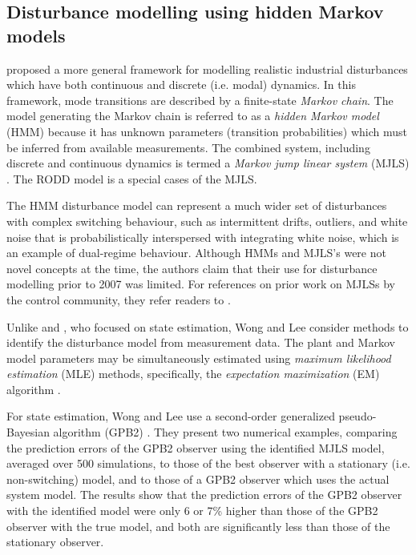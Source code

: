 \subsection{Disturbance modelling using hidden Markov models}
\label{hidden_markov_models}

\cite{wong_disturbance_2007} proposed a more general framework for modelling realistic industrial disturbances which have both continuous and discrete (i.e. modal) dynamics. In this framework, mode transitions are described by a finite-state \textit{Markov chain}. The model generating the Markov chain is referred to as a \textit{hidden Markov model} (HMM) because it has unknown parameters (transition probabilities) which must be inferred from available measurements. The combined system, including discrete and continuous dynamics is termed a \textit{Markov jump linear system} (MJLS) \citep{costa_discrete-time_2005}. The RODD model is a special cases of the MJLS.


The HMM disturbance model can represent a much wider set of disturbances with complex switching behaviour, such as intermittent drifts, outliers, and white noise that is probabilistically interspersed with integrating white noise, which is an example of dual-regime behaviour. Although HMMs and MJLS's were not novel concepts at the time, the authors claim that their use for disturbance modelling prior to 2007 was limited. For references on prior work on MJLSs by the control community, they refer readers to \cite{costa_discrete-time_2005}.

Unlike \cite{robertson_detection_1995} and \cite{eriksson_classification_1996}, who focused on state estimation, Wong and Lee consider methods to identify the disturbance model from measurement data. The plant and Markov model parameters may be simultaneously estimated using \textit{maximum likelihood estimation} (MLE) methods, specifically, the \textit{expectation maximization} (EM) algorithm \citep{dempster_maximum_1977}.

For state estimation, Wong and Lee use a second-order generalized pseudo-Bayesian algorithm (GPB2)  \citep{bar-shalom_estimation_1993}. They present two numerical examples, comparing the prediction errors of the GPB2 observer using the identified MJLS model, averaged over 500 simulations, to those of the best observer with a stationary (i.e. non-switching) model, and to those of a GPB2 observer which uses the actual system model.  The results show that the prediction errors of the GPB2 observer with the identified model were only 6 or 7\% higher than those of the GPB2 observer with the true model, and both are significantly less than those of the stationary observer.

